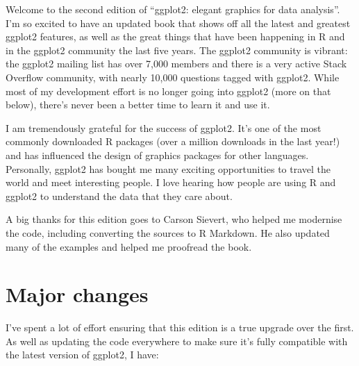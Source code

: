 \preface

Welcome to the second edition of ``ggplot2: elegant graphics for data
analysis''. I'm so excited to have an updated book that shows off all
the latest and greatest ggplot2 features, as well as the great things
that have been happening in R and in the ggplot2 community the last five
years. The ggplot2 community is vibrant: the ggplot2 mailing list has
over 7,000 members and there is a very active Stack Overflow community,
with nearly 10,000 questions tagged with ggplot2. While most of my
development effort is no longer going into ggplot2 (more on that below),
there's never been a better time to learn it and use it.

I am tremendously grateful for the success of ggplot2. It's one of the
most commonly downloaded R packages (over a million downloads in the
last year!) and has influenced the design of graphics packages for other
languages. Personally, ggplot2 has bought me many exciting opportunities
to travel the world and meet interesting people. I love hearing how
people are using R and ggplot2 to understand the data that they care
about.

A big thanks for this edition goes to Carson Sievert, who helped me
modernise the code, including converting the sources to R Markdown. He
also updated many of the examples and helped me proofread the book.

\section*{Major changes}

I've spent a lot of effort ensuring that this edition is a true upgrade
over the first. As well as updating the code everywhere to make sure
it's fully compatible with the latest version of ggplot2, I have:

